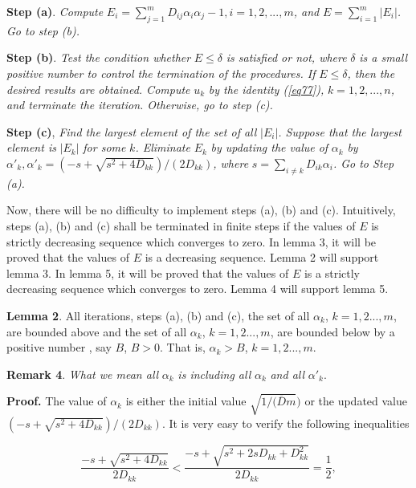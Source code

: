 \documentclass [18pt]{article}
\begin{document}
\textbf{Step (a)}. \textit{Compute }$E_i = \sum\limits_{j = 1}^m {D_{ij} \alpha _i \alpha _j
} - 1,i = 1,2,...,m$\textit{, and }$E = \sum\limits_{i = 1}^m {\left| {E_i } \right|} $\textit{. Go to step (b).}

\textbf{Step (b)}. \textit{Test the condition whether }$E \le \delta $\textit{ is satisfied or not, where }$\delta $\textit{ is a small positive number to control the termination of the procedures. If }$E \le \delta $\textit{, then the desired results are obtained. Compute }$u_k $\textit{ by the identity (\ref{eq77}), }$k =
1,2,...,n$\textit{, and terminate the iteration. Otherwise, go to step (c).}

\textbf{Step (c)}, \textit{Find the largest element of the set of all }$\left| {E_i } \right|$\textit{. Suppose that the largest element is }$\left| {E_k } \right|$\textit{ for some }$k$\textit{. Eliminate }$E_k $\textit{ by updating the value of }$\alpha
_k $\textit{ by }$\alpha '_k , \alpha '_k = ( - s + \sqrt {s^2 + 4D_{kk} } ) / (2D_{kk}
)$\textit{, where }$s = \sum\limits_{i \ne k} {D_{ik} \alpha _i } $\textit{. Go to Step (a).}

Now, there will be no difficulty to implement steps (a), (b) and (c).
Intuitively, steps (a), (b) and (c) shall be terminated in finite steps if
the values of $E$ is strictly decreasing sequence which converges to zero.
In lemma 3, it will be proved that the values of $E$ is a decreasing
sequence. Lemma 2 will support lemma 3$.$ In lemma 5, it will be proved that
the values of $E$ is a strictly decreasing sequence which converges to zero.
Lemma 4 will support lemma 5.

\textbf{Lemma 2}. All iterations, steps (a), (b) and (c), the set of all
$\alpha _k $, $k = 1,2...,m$, are bounded above and the set of all $\alpha
_k $, $k = 1,2...,m$, are bounded below by a positive number , say $B$, $B >
0$. That is, $\alpha _k > B$, $k = 1,2...,m$.

\textbf{Remark 4}. \textit{What we mean all }$\alpha _k $\textit{ is including all }$\alpha _k $\textit{ and all }$\alpha '_k .$

\textbf{Proof.} The value of $\alpha _k $ is either the initial value $\sqrt
{1 / (\overline D m} )$ or the updated value $( - s + \sqrt {s^2 + 4D_{kk} }
) / (2D_{kk} )$. It is very easy to verify the following inequalities


\begin{equation}
\label{eq84}
\frac{ - s + \sqrt {s^2 + 4D_{kk} } }{2D_{kk} } < \frac{ - s + \sqrt {s^2 +
2sD_{kk} + D_{kk}^2 } }{2D_{kk} } = \frac{1}{2},
\end{equation}
\end{document}
